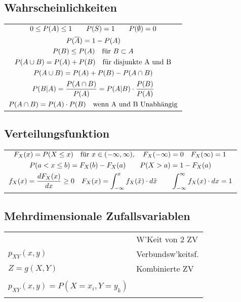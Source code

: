 \documentclass[a4paper]{article}
\begin{document}
\begin{twocolumn}
\subsection{Wahrscheinlichkeiten}
\begin{tabular}{c} 
  $\displaystyle 0 \leq P(A) \leq 1 \qquad \displaystyle P(S) = 1 \qquad P(\emptyset) = 0$ \\
  $\displaystyle P(\overline{A}) = 1 - P(A)$ \\
  $\displaystyle P(B) \leq P(A) \quad \text{für } B \subset A$ \\
  $\displaystyle P(A \cup B) = P(A) + P(B) \quad \text{für disjunkte A und B}$ \\
  $\displaystyle P(A \cup B) = P(A) + P(B) - P(A \cap B)$ \\
  $\displaystyle P(B \vert A) = \frac{P(A \cap B)}{P(A)} = P(A \vert B) \cdot \frac{P(B)}{P(A)}$ \\
  $\displaystyle P(A \cap B) = P(A) \cdot P(B) \quad \text{wenn A und B Unabhängig}$ \\
\end{tabular}

\subsection{Verteilungsfunktion}
\begin{tabular}{c}
  $\displaystyle F_X(x) = P(X \leq x) \quad \text{für } x \in (-\infty, \infty), \quad
  F_X(-\infty) = 0 \quad F_X(\infty) = 1$ \\
  $\displaystyle P(a < x \leq b) = F_X(b) - F_X(a) \qquad P(X > a) = 1 - F_X(a)$ \\
  $\displaystyle f_X(x) = \frac{dF_X(x)}{dx} \geq 0 \quad F_X(x) = \int_{-\infty}^x f_X(\tilde{x})
  \cdot d\tilde{x} \qquad \int_{-\infty}^{\infty}f_X(x) \cdot dx = 1$
\end{tabular}

\subsection{Mehrdimensionale Zufallsvariablen}
\begin{definition}
  \begin{tabularx}{\columnwidth}{XX}
    \begin{tabular}{ll}
      $F_{XY}(x,y)$ & W'Keit von 2 ZV
      \\
      $p_{XY}(x,y)$ &
      Verbundsw'keitsf.\\
      $Z = g(X,Y)$ &
      Kombinierte ZV \\
    \end{tabular}&
    \begin{tabular}{l}
      $F_{XY}(x,y) = P(X \leq x, Y \leq y)$\\
      $p_{XY}(x,y) = P(X=x_i, Y=y_k)$  \\
    \end{tabular}
  \end{tabularx}
\end{definition} 


\end{twocolumn}
\end{document}
